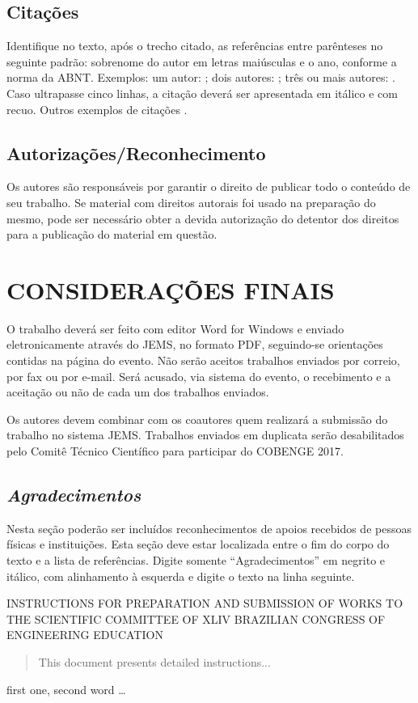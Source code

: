\documentclass[12pt,a4paper]{article}
\begin{document}
\subsection{Citações}
Identifique no texto, após o trecho citado, as referências entre parênteses no seguinte padrão: sobrenome do autor em letras maiúsculas e o ano, conforme a norma da ABNT. Exemplos: um autor:  \cite{TOZZI2004}; dois autores: \cite{JOAO2000} ; três ou mais autores: \cite{PEDRO2100}. Caso ultrapasse cinco linhas, a citação deverá ser apresentada em itálico e com recuo. Outros exemplos de citações \cite{Jaffe79} \cite{Ieee2000}.

\subsection{Autorizações/Reconhecimento}
Os autores são responsáveis por garantir o direito de publicar todo o conteúdo de seu trabalho. Se material com direitos autorais foi usado na preparação do mesmo, pode ser necessário obter a devida autorização do detentor dos direitos para a publicação do material em questão.

\section{CONSIDERAÇÕES FINAIS}
O trabalho deverá ser feito com editor Word for Windows e enviado eletronicamente através do JEMS, no formato PDF, seguindo-se orientações contidas na página do evento. Não serão aceitos trabalhos enviados por correio, por fax ou por e-mail. Será acusado, via sistema do evento, o recebimento e a aceitação ou não de cada um dos trabalhos enviados.


Os autores devem combinar com os coautores quem realizará a submissão do trabalho no sistema JEMS. Trabalhos enviados em duplicata serão desabilitados pelo Comitê Técnico Científico para participar do COBENGE 2017.

\subsection{\it \textbf {Agradecimentos}}
Nesta seção poderão ser incluídos reconhecimentos de apoios recebidos de pessoas físicas e instituições. Esta seção deve estar localizada entre o fim do corpo do texto e a lista de referências. Digite somente “Agradecimentos” em negrito e itálico, com alinhamento à esquerda e digite o texto na linha seguinte.


\renewcommand{\refname}{REFERÊNCIAS BIBLIOGRÁFICAS}


INSTRUCTIONS FOR PREPARATION AND SUBMISSION OF WORKS TO THE SCIENTIFIC COMMITTEE OF XLIV BRAZILIAN CONGRESS OF ENGINEERING EDUCATION

\begin{abstract}
This document presents detailed instructions...
\end{abstract}
%
\begin{keywords}
first one, second word …
\end{keywords}
\end{document}
